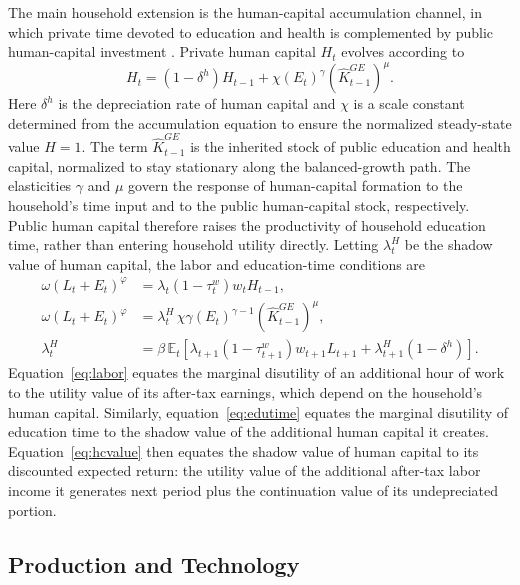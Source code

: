 \documentclass[a4paper,11pt]{article}
\begin{document}
The main household extension is the human-capital accumulation channel, in which private time devoted to education and health is complemented by public human-capital investment \citep{BlankenauSimpson2004, Dissouetal2016, Atoliaetal2021}.
Private human capital $H_t$ evolves according to
\begin{equation} \label{eq:humancapital}
    H_{t} = \left(1 - \delta^{h}\right) H_{t-1} + \chi \left(E_t\right)^{\gamma} \left(\hat{K}_{t-1}^{GE}\right)^{\mu}.
\end{equation}
Here $\delta^{h}$ is the depreciation rate of human capital and $\chi$ is a scale constant determined from the accumulation equation to ensure the normalized steady-state value $H=1$.
The term $\hat{K}_{t-1}^{GE}$ is the inherited stock of public education and health capital, normalized to stay stationary along the balanced-growth path.
The elasticities $\gamma$ and $\mu$ govern the response of human-capital formation to the household's time input and to the public human-capital stock, respectively.
Public human capital therefore raises the productivity of household education time, rather than entering household utility directly.
Letting $\lambda_t^{H}$ be the shadow value of human capital, the labor and education-time conditions are
\begin{align}
    \omega \left(L_t + E_t\right)^{\varphi} &= \lambda_t \left(1-\tau_t^{w}\right) w_t H_{t-1}, \label{eq:labor}\\
    \omega \left(L_t + E_t\right)^{\varphi} &= \lambda_t^{H}\, \chi \gamma \left(E_t\right)^{\gamma-1} \left(\hat{K}_{t-1}^{GE}\right)^{\mu}, \label{eq:edutime}\\
    \lambda_t^{H} &= \beta\, \mathbb{E}_t\!\left[\lambda_{t+1}\left(1-\tau_{t+1}^{w}\right) w_{t+1} L_{t+1} + \lambda_{t+1}^{H}\left(1-\delta^{h}\right)\right]. \label{eq:hcvalue}
\end{align}
Equation~\eqref{eq:labor} equates the marginal disutility of an additional hour of work to the utility value of its after-tax earnings, which depend on the household's human capital.
Similarly, equation~\eqref{eq:edutime} equates the marginal disutility of education time to the shadow value of the additional human capital it creates.
Equation~\eqref{eq:hcvalue} then equates the shadow value of human capital to its discounted expected return: the utility value of the additional after-tax labor income it generates next period plus the continuation value of its undepreciated portion.

\subsection{Production and Technology}
\end{document}
